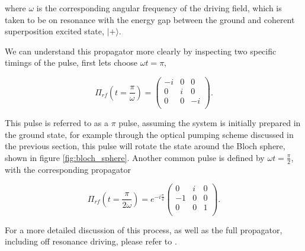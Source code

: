 where $\omega$ is the corresponding angular frequency of the driving field, which is taken to be on resonance with the energy gap between the ground and coherent superposition excited state, $| + \rangle$.

We can understand this propagator more clearly by inspecting two specific timings of the pulse, first lets choose $\omega t = \pi$,

\begin{equation}
    \Pi_{rf}(t=\frac{\pi}{\omega}) = \begin{pmatrix}
         -i & 0 & 0 \\
         0 & i & 0 \\
         0 & 0 & -i \\
    \end{pmatrix}.
\end{equation}

This pulse is referred to as a $\pi$ pulse, assuming the system is initially prepared in the ground state, for example through the optical pumping scheme discussed in the previous section, this pulse will rotate the state around the Bloch sphere, shown in figure \ref{fig:bloch_sphere}. Another common pulse is defined by $\omega t = \frac{\pi}{2}$, with the corresponding propagator

\begin{equation}
    \Pi_{rf}(t=\frac{\pi}{2 \omega}) = e^{-i \frac{\pi}{4}} \begin{pmatrix}
         0 & i & 0 \\
         - 1 & 0 & 0 \\
         0 & 0 & 1 \\
    \end{pmatrix}.
\end{equation}

For a more detailed discussion of this process, as well as the full propagator, including off resonance driving, please refer to \cite{Tarbutt_2009}.
